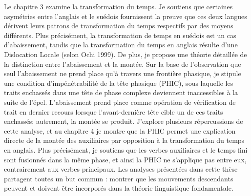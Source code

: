 Le chapitre 3 examine la transformation du temps. Je soutiens que certaines asym\'{e}tries entre l'anglais et le su\'{e}dois fournissent la preuve que ces deux langues d\'{e}rivent leurs patrons de transformation du temps respectifs par des moyens diff\'{e}rents. Plus pr\'{e}cis\'{e}ment, la transformation de temps en su\'{e}dois est un cas d'abaissement, tandis que la transformation du temps en anglais r\'{e}sulte d'une Dislocation Locale (selon Ochi 1999).  De plus, je propose une th\'{e}orie d\'{e}taill\'{e}e de la distinction entre l'abaissement et la mont\'{e}e. Sur la base de l'observation que seul l'abaissement ne prend place qu'\`{a} travers une fronti\`{e}re phasique, je stipule une condition d'imp\'{e}n\'{e}trabilit\'{e} de la t\^{e}te phasique (PHIC), sous laquelle les traits enchass\'{e}s dans une t\^{e}te de phase complexe deviennent inaccessibles \`{a} la suite de l'\'{e}pel. L'abaissement prend place comme op\'{e}ration de v\'{e}rification de trait en dernier recours lorsque l'avant-derni\`{e}re t\^{e}te cible un de ces traits enchass\'{e}s; autrement, la mont\'{e}e se produit. J'explore plusieurs r\'{e}percussions de cette analyse, et au chapitre 4 je montre que la PHIC permet une explication directe de la mont\'{e}e des auxiliaires par opposition \`{a} la transformation du temps en anglais. Plus pr\'{e}cis\'{e}ment, je soutiens que les verbes auxiliaires et le temps fini sont fusionn\'{e}s dans la m\^{e}me phase, et ainsi la PHIC ne s'applique pas entre eux, contrairement aux verbes principaux. Les analyses pr\'{e}sent\'{e}es dans cette th\`{e}se partagent toutes un but commun : montrer que les mouvements descendants peuvent et doivent \^{e}tre incorpor\'{e}s dans la th\'{e}orie linguistique fondamentale.

\onehalfspacing